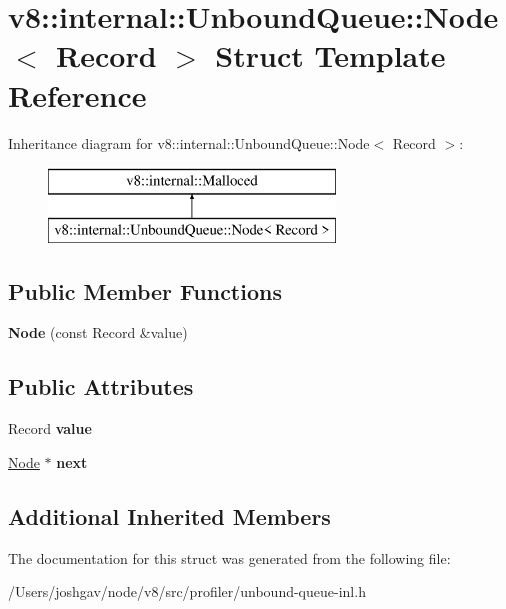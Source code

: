 \hypertarget{structv8_1_1internal_1_1_unbound_queue_1_1_node}{}\section{v8\+:\+:internal\+:\+:Unbound\+Queue\+:\+:Node$<$ Record $>$ Struct Template Reference}
\label{structv8_1_1internal_1_1_unbound_queue_1_1_node}
Inheritance diagram for v8\+:\+:internal\+:\+:Unbound\+Queue\+:\+:Node$<$ Record $>$\+:\begin{figure}[H]
\begin{center}
\leavevmode
\includegraphics[height=2.000000cm]{structv8_1_1internal_1_1_unbound_queue_1_1_node}
\end{center}
\end{figure}
\subsection*{Public Member Functions}
\begin{DoxyCompactItemize}
\item 
{\bfseries Node} (const Record \&value)\hypertarget{structv8_1_1internal_1_1_unbound_queue_1_1_node_a55c00a4d6022ed3aa9fcb416149065a4}{}\label{structv8_1_1internal_1_1_unbound_queue_1_1_node_a55c00a4d6022ed3aa9fcb416149065a4}

\end{DoxyCompactItemize}
\subsection*{Public Attributes}
\begin{DoxyCompactItemize}
\item 
Record {\bfseries value}\hypertarget{structv8_1_1internal_1_1_unbound_queue_1_1_node_a31f0b0c344dc954643a5cfea8f784619}{}\label{structv8_1_1internal_1_1_unbound_queue_1_1_node_a31f0b0c344dc954643a5cfea8f784619}

\item 
\hyperlink{structv8_1_1internal_1_1_unbound_queue_1_1_node}{Node} $\ast$ {\bfseries next}\hypertarget{structv8_1_1internal_1_1_unbound_queue_1_1_node_abfa5644ad3076a77801c08975716805d}{}\label{structv8_1_1internal_1_1_unbound_queue_1_1_node_abfa5644ad3076a77801c08975716805d}

\end{DoxyCompactItemize}
\subsection*{Additional Inherited Members}


The documentation for this struct was generated from the following file\+:\begin{DoxyCompactItemize}
\item 
/\+Users/joshgav/node/v8/src/profiler/unbound-\/queue-\/inl.\+h\end{DoxyCompactItemize}
